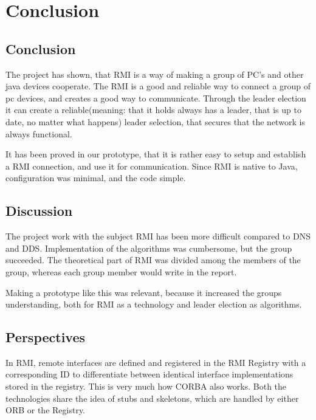 \chapter{Conclusion}
\section{Conclusion}

The project has shown, that RMI is a way of making a group of PC's and other java devices cooperate.
The RMI is a good and reliable way to connect a group of pc devices, and creates a good way to communicate. Through the leader election it can create a reliable(meaning: that it holds always has a leader, that is up to date, no matter what happens) leader selection, that secures that the network is always functional.

It has been proved in our prototype, that it is rather easy to setup and establish a RMI connection, and use it for communication. Since RMI is native to Java, configuration was minimal, and the code simple.

\section{Discussion}
The project work with the subject RMI has been more difficult compared to DNS and DDS.
Implementation of the algorithms was cumbersome, but the group succeeded.
The theoretical part of RMI was divided among the members of the group, whereas each group member would write in the report.

Making a prototype like this was relevant, because it increased the groups understanding, both for RMI as a technology and leader election as algorithms.

\section{Perspectives}
In RMI, remote interfaces are defined and registered in the RMI Registry with a corresponding ID to differentiate between identical interface implementations stored in the registry. This is very much how CORBA also works. Both the technologies share the idea of stubs and skeletons, which are handled by either ORB or the Registry.
